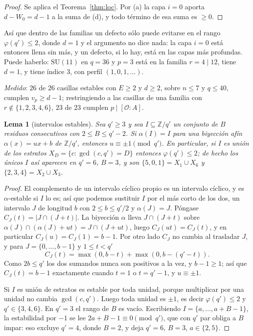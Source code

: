 \documentclass[11pt,a4paper]{article}
\newtheorem{lemma}[theorem]{Lema}
\theoremstyle{definition}
\newcommand{\SU}{\mathrm{SU}}
\newcommand{\ZZ}{\mathbb{Z}}
\newcommand{\cO}{\mathcal{O}}
\newcommand{\medido}[1]{\emph{Medido}: #1}
\begin{document}
\begin{proof}
Se aplica el Teorema~\ref{thm:loc}. Por (a) la capa $i=0$ aporta $d-W_0=d-1$ a la suma de (d), y
todo t\'ermino de esa suma es $\ge0$.
\end{proof}

As\'i que dentro de las familias un defecto s\'olo puede evitarse en el rango $\varphi(q')\le2$,
donde $d=1$ y el argumento no dice nada: la capa $i=0$ est\'a entonces llena sin m\'as, y un
defecto, si lo hay, est\'a en las capas m\'as profundas. Puede haberlo: $\SU(11)$ en $q=36$ y $p=3$
est\'a en la familia $r=4\mid12$, tiene $d=1$, y tiene \'indice $3$, con perfil $(1,0,1,\dots)$.

\medido{$26$ de $26$ casillas estables con $E\ge2$ y $d\ge2$, sobre $n\le7$ y $q\le40$, cumplen
$v_p\ge d-1$; restringiendo a las casillas de una familia con $r\notin\{1,2,3,4,6\}$, $23$ de $23$
cumplen $p\mid[\cO:A]$.}

\begin{lemma}[intervalos estables]\label{lem:inter}
Sea $q'\ge3$ y sea $I\subseteq\ZZ/q'$ un conjunto de $B$ residuos consecutivos con
$2\le B\le q'-2$. Si $\alpha(I)=I$ para una biyecci\'on af\'in $\alpha(x)=ux+b$ de $\ZZ/q'$,
entonces $u\equiv\pm1\pmod{q'}$. En particular, si
$I$ es uni\'on de los estratos $X_D=\{c:\gcd(c,q')=D\}$ entonces $\varphi(q')\le2$; de hecho los
\'unicos $I$ as\'i aparecen en $q'=6$, $B=3$, y son $\{5,0,1\}=X_1\cup X_6$ y
$\{2,3,4\}=X_2\cup X_3$.
\end{lemma}

\begin{proof}
El complemento de un intervalo c\'iclico propio es un intervalo c\'iclico, y es $\alpha$-estable
si $I$ lo es; as\'i que podemos sustituir $I$ por el m\'as corto de los dos, un intervalo $J$ de
longitud $b$ con $2\le b\le q'/2$ y $\alpha(J)=J$. P\'ongase $C_J(t)=|J\cap(J+t)|$. La biyecci\'on
$\alpha$ lleva $J\cap(J+t)$ sobre $\alpha(J)\cap(\alpha(J)+ut)=J\cap(J+ut)$, luego
$C_J(ut)=C_J(t)$, y en
particular $C_J(u)=C_J(1)=b-1$. Por otro lado $C_J$ no cambia al trasladar $J$, y para
$J=\{0,\dots,b-1\}$ y $1\le t<q'$
\[
C_J(t)=\max(0,b-t)+\max(0,b-(q'-t)).
\]
Como $2b\le q'$ los dos sumandos nunca son positivos a la vez, y $b-1\ge1$; as\'i que $C_J(t)=b-1$
exactamente cuando $t=1$ o $t=q'-1$, y $u\equiv\pm1$.

Si $I$ es uni\'on de estratos es estable por toda unidad, porque multiplicar por una unidad no
cambia $\gcd(c,q')$. Luego toda unidad es $\pm1$, es decir $\varphi(q')\le2$ y $q'\in\{3,4,6\}$. En
$q'=3$ el rango de $B$ es vac\'io. Escribiendo $I=\{a,\dots,a+B-1\}$, la estabilidad por $-1$ se lee
$2a+B-1\equiv0\pmod{q'}$, que con $q'$ par obliga a $B$ impar: eso excluye $q'=4$, donde $B=2$, y
deja $q'=6$, $B=3$, $a\in\{2,5\}$.
\end{proof}
\end{document}
